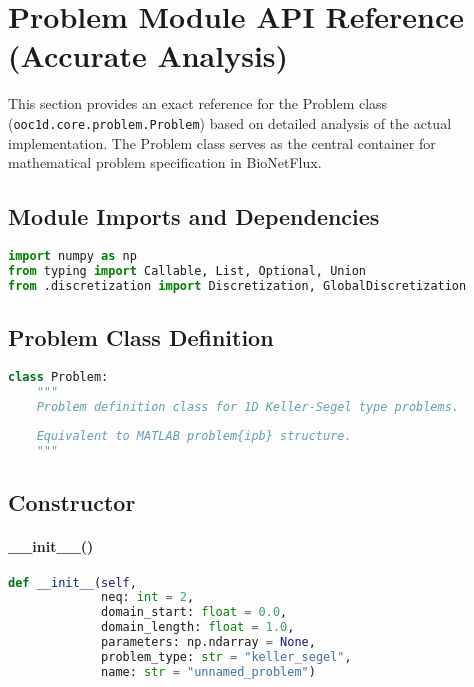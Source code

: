 %

\section{Problem Module API Reference (Accurate Analysis)}
\label{sec:problem_module_api_accurate}

This section provides an exact reference for the Problem class (\texttt{ooc1d.core.problem.Problem}) based on detailed analysis of the actual implementation. The Problem class serves as the central container for mathematical problem specification in BioNetFlux.

\subsection{Module Imports and Dependencies}

\begin{lstlisting}[language=Python, caption=Module Dependencies]
import numpy as np
from typing import Callable, List, Optional, Union
from .discretization import Discretization, GlobalDiscretization
\end{lstlisting}

\subsection{Problem Class Definition}
\label{subsec:problem_class_definition}

\begin{lstlisting}[language=Python, caption=Class Declaration]
class Problem:
    """
    Problem definition class for 1D Keller-Segel type problems.
    
    Equivalent to MATLAB problem{ipb} structure.
    """
\end{lstlisting}

\subsection{Constructor}
\label{subsec:constructor}

\paragraph{\_\_init\_\_()}
\begin{lstlisting}[language=Python, caption=Problem Constructor]
def __init__(self, 
             neq: int = 2,
             domain_start: float = 0.0,
             domain_length: float = 1.0,
             parameters: np.ndarray = None,
             problem_type: str = "keller_segel",
             name: str = "unnamed_problem")
\end{lstlisting}

